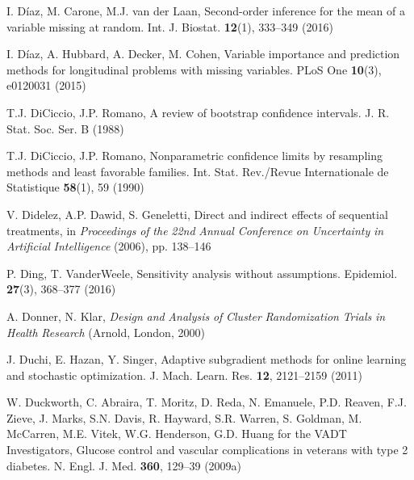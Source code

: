 \begin{list}{}{\setlength{\leftmargin}{2.1em}\setlength{\labelwidth}{0pt}
  \setlength{\labelsep}{0pt}\setlength{\itemindent}{-2.1em}
  \setlength{\parsep}{0pt}\setlength{\itemsep}{2pt}\setlength{\topsep}{0pt}}
\item\label{refentry:REF087}I. Díaz, M. Carone, M.J. van der Laan, Second-order inference for the mean of a variable missing at random. Int. J. Biostat. \textbf{12}(1), 333--349 (2016)\label{refend:REF087}
\item\label{refentry:REF088}I. Díaz, A. Hubbard, A. Decker, M. Cohen, Variable importance and prediction methods for longitudinal problems with missing variables. PLoS One \textbf{10}(3), e0120031 (2015)\label{refend:REF088}
\item\label{refentry:REF089}T.J. DiCiccio, J.P. Romano, A review of bootstrap confidence intervals. J. R. Stat. Soc. Ser. B (1988)\label{refend:REF089}
\item\label{refentry:REF090}T.J. DiCiccio, J.P. Romano, Nonparametric confidence limits by resampling methods and least favorable families. Int. Stat. Rev./Revue Internationale de Statistique \textbf{58}(1), 59 (1990)\label{refend:REF090}
\item\label{refentry:REF091}V. Didelez, A.P. Dawid, S. Geneletti, Direct and indirect effects of sequential treatments, in \textit{Proceedings} \textit{of} \textit{the} \textit{22nd} \textit{Annual} \textit{Conference} \textit{on} \textit{Uncertainty} \textit{in} \textit{Artificial} \textit{Intelligence} (2006), pp. 138--146\label{refend:REF091}
\item\label{refentry:REF092}P. Ding, T. VanderWeele, Sensitivity analysis without assumptions. Epidemiol. \textbf{27}(3), 368--377 (2016)\label{refend:REF092}
\item\label{refentry:REF093}A. Donner, N. Klar, \textit{Design} \textit{and} \textit{Analysis} \textit{of} \textit{Cluster} \textit{Randomization} \textit{Trials} \textit{in} \textit{Health} \textit{Research} (Arnold, London, 2000)\label{refend:REF093}
\item\label{refentry:REF094}J. Duchi, E. Hazan, Y. Singer, Adaptive subgradient methods for online learning and stochastic optimization. J. Mach. Learn. Res. \textbf{12}, 2121--2159 (2011)\label{refend:REF094}
\item\label{refentry:REF095}W. Duckworth, C. Abraira, T. Moritz, D. Reda, N. Emanuele, P.D. Reaven, F.J. Zieve, J. Marks, S.N. Davis, R. Hayward, S.R. Warren, S. Goldman, M. McCarren, M.E. Vitek, W.G. Henderson, G.D. Huang for the VADT Investigators, Glucose control and vascular complications in veterans with type 2 diabetes. N. Engl. J. Med. \textbf{360}, 129--39 (2009a)\label{refend:REF095}

\end{list}
